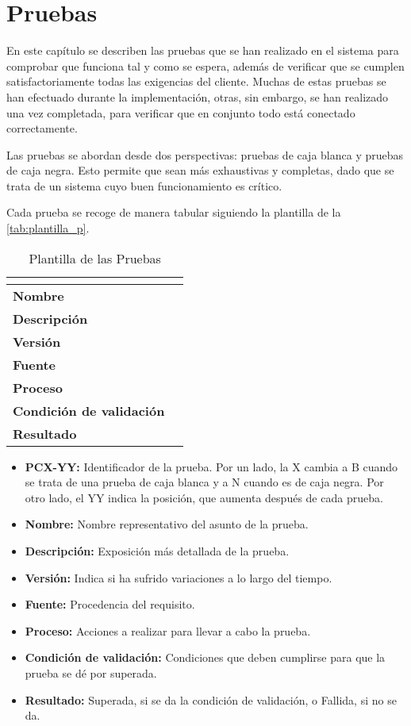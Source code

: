 \chapter{Pruebas}
\label{ch:pruebas}
En este capítulo se describen las pruebas que se han realizado en el sistema para comprobar que funciona tal y como se espera, además de verificar que se cumplen satisfactoriamente todas las exigencias del cliente. Muchas de estas pruebas se han efectuado durante la implementación, otras, sin embargo, se han realizado una vez completada, para verificar que en conjunto todo está conectado correctamente.

Las pruebas se abordan desde dos perspectivas: pruebas de caja blanca y pruebas de caja negra. Esto permite que sean más exhaustivas y completas, dado que se trata de un sistema cuyo buen funcionamiento es crítico. 

Cada prueba se recoge de manera tabular siguiendo la plantilla de la \autoref{tab:plantilla_p}.
\begin{table}[H]
	\centering
	\caption{Plantilla de las Pruebas}
	\label{tab:plantilla_p}
	\begin{tabular}{|l|p{}|}
		\hline
		\multicolumn{2}{|c|}{\cellcolor[HTML]{BFBFBF}{\color[HTML]{000000} \textbf{PCX-YY}}} \\ \hline
		\textbf{Nombre}                  &   \\ \hline
		\textbf{Descripción}             &   \\ \hline
		\textbf{Versión}                 &   \\ \hline
		\textbf{Fuente}                  &   \\ \hline
		\textbf{Proceso}                 &   \\ \hline
		\textbf{Condición de validación} &   \\ \hline
		\textbf{Resultado}               &   \\ \hline
	\end{tabular}
\end{table}
\begin{itemize}
	\item \textbf{PCX-YY:} Identificador de la prueba. Por un lado, la X cambia a B cuando se trata de una prueba de caja blanca y a N cuando es de caja negra. Por otro lado, el YY indica la posición, que aumenta después de cada prueba.
	\item \textbf{Nombre:} Nombre representativo del asunto de la prueba.
	\item \textbf{Descripción:} Exposición más detallada de la prueba.
	\item \textbf{Versión:} Indica si ha sufrido variaciones a lo largo del tiempo.
	\item \textbf{Fuente:} Procedencia del requisito.
	\item \textbf{Proceso:} Acciones a realizar para llevar a cabo la prueba.
	\item \textbf{Condición de validación:} Condiciones que deben cumplirse para que la prueba se dé por superada.
	\item \textbf{Resultado:} Superada, si se da la condición de validación, o Fallida, si no se da.
\end{itemize}

